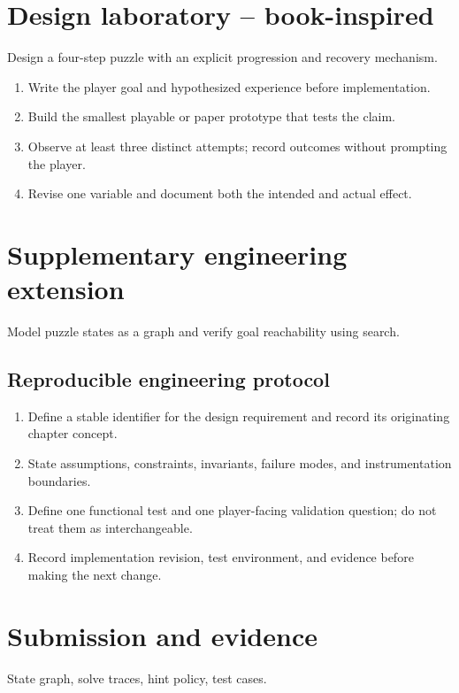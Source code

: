 \documentclass[11pt]{article}
\begin{document}
\section{Design laboratory -- book-inspired}
Design a four-step puzzle with an explicit progression and recovery mechanism.

\begin{enumerate}
\item Write the player goal and hypothesized experience before implementation.
\item Build the smallest playable or paper prototype that tests the claim.
\item Observe at least three distinct attempts; record outcomes without prompting the player.
\item Revise one variable and document both the intended and actual effect.
\end{enumerate}

\section{Supplementary engineering extension}
Model puzzle states as a graph and verify goal reachability using search.


\subsection{Reproducible engineering protocol}
\begin{enumerate}
\item Define a stable identifier for the design requirement and record its originating chapter concept.
\item State assumptions, constraints, invariants, failure modes, and instrumentation boundaries.
\item Define one functional test and one player-facing validation question; do not treat them as interchangeable.
\item Record implementation revision, test environment, and evidence before making the next change.
\end{enumerate}

\section{Submission and evidence}
State graph, solve traces, hint policy, test cases.
\end{document}
